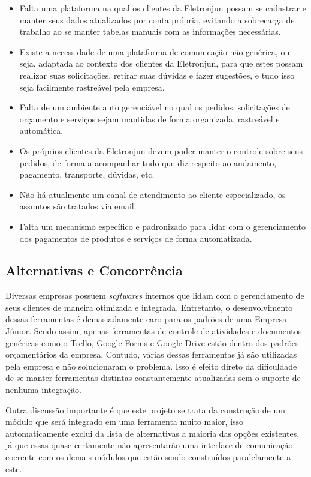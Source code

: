       \begin{itemize}
        \item Falta uma plataforma na qual os clientes da Eletronjun possam se cadastrar e manter seus dados atualizados por conta própria, evitando a sobrecarga de trabalho ao se manter tabelas manuais com as informações necessárias.
        \item Existe a necessidade de uma plataforma de comunicação não genérica, ou seja, adaptada ao contexto dos clientes da Eletronjun, para que estes possam realizar suas solicitações, retirar suas dúvidas e fazer sugestões, e tudo isso seja facilmente rastreável pela empresa.
        \item Falta de um ambiente auto gerenciável no qual os pedidos, solicitações de orçamento e serviços sejam mantidas de forma organizada, rastreável e automática.
        \item Os próprios clientes da Eletronjun devem poder manter o controle sobre seus pedidos, de forma a acompanhar tudo que diz respeito ao andamento, pagamento, transporte, dúvidas, etc.
        \item Não há atualmente um canal de atendimento ao cliente especializado, os assuntos são tratados via email.
        \item Falta um mecanismo específico e padronizado para lidar com o gerenciamento dos pagamentos de produtos e serviços de forma automatizada.
      \end{itemize}

    \subsection{Alternativas e Concorrência}
Diversas empresas possuem \textit{softwares} internos que lidam com o gerenciamento de seus clientes de maneira otimizada e integrada. Entretanto, o desenvolvimento dessas ferramentas é demasiadamente caro para os padrões de uma Empresa Júnior. Sendo assim, apenas ferramentas de controle de atividades e documentos genéricas como o Trello, Google Forms e Google Drive estão dentro dos padrões orçamentários da empresa. Contudo, várias dessas ferramentas já são utilizadas pela empresa e não solucionaram o problema. Isso é efeito direto da dificuldade de se manter ferramentas distintas constantemente atualizadas sem o suporte de nenhuma integração.

Outra discussão importante é que este projeto se trata da construção de um módulo que será integrado em uma ferramenta muito maior, isso automaticamente exclui da lista de alternativas a maioria das opções existentes, já que essas quase certamente não apresentarão uma interface de comunicação coerente com os demais módulos que estão sendo construídos paralelamente a este.

